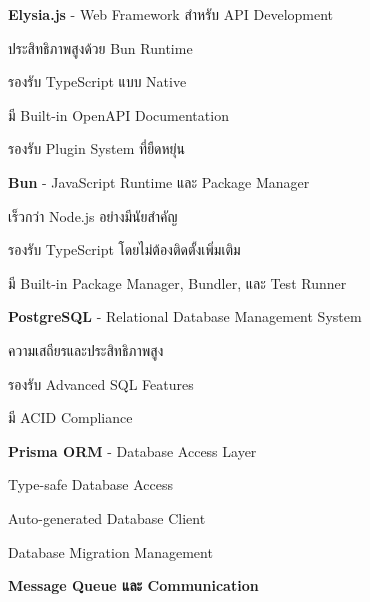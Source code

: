 \begin{mycustomenum2}
    \item \textbf{Elysia.js} - Web Framework สำหรับ API Development
    \begin{mycustomenum2}
        \item ประสิทธิภาพสูงด้วย Bun Runtime
        \item รองรับ TypeScript แบบ Native
        \item มี Built-in OpenAPI Documentation
        \item รองรับ Plugin System ที่ยืดหยุ่น
    \end{mycustomenum2}

    \item \textbf{Bun} - JavaScript Runtime และ Package Manager
    \begin{mycustomenum2}
        \item เร็วกว่า Node.js อย่างมีนัยสำคัญ
        \item รองรับ TypeScript โดยไม่ต้องติดตั้งเพิ่มเติม
        \item มี Built-in Package Manager, Bundler, และ Test Runner
    \end{mycustomenum2}

    \item \textbf{PostgreSQL} - Relational Database Management System
    \begin{mycustomenum2}
        \item ความเสถียรและประสิทธิภาพสูง
        \item รองรับ Advanced SQL Features
        \item มี ACID Compliance
    \end{mycustomenum2}

    \item \textbf{Prisma ORM} - Database Access Layer
    \begin{mycustomenum2}
        \item Type-safe Database Access
        \item Auto-generated Database Client
        \item Database Migration Management
    \end{mycustomenum2}
\end{mycustomenum2}

\vspace{0.5em}
\textbf{Message Queue และ Communication}
\vspace{0.5em}

